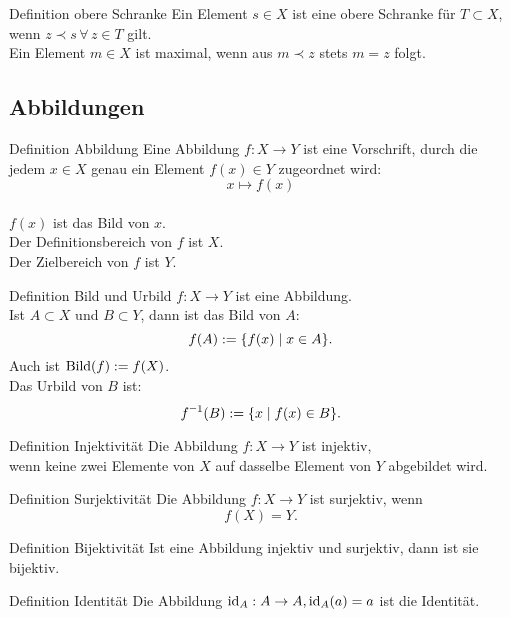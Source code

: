 \documentclass[main.tex]{subfiles}
\begin{document}
\begin{karte}{Definition obere Schranke}
    Ein Element \( s \in X \) ist eine obere Schranke für 
    \( T \subset X \), wenn \( z \prec s \,\forall \, z \in T \) 
    gilt.\\
    Ein Element \( m \in X \) ist maximal, wenn aus 
    \( m \prec z \) stets \( m = z \) folgt.
\end{karte}
\subsection*{Abbildungen}
\begin{karte}{Definition Abbildung}
    Eine Abbildung \(f : X \rightarrow Y\) ist eine Vorschrift, 
    durch die jedem \(x \in X \) genau ein Element \(f(x) \in Y\)
    zugeordnet wird:
    \[ x \mapsto f(x)\] \\
    \( f(x) \) ist das Bild von \(x\). \\
    Der Definitionsbereich von \(f\) ist \(X\). \\
    Der Zielbereich von \(f\) ist \(Y\). 
\end{karte}
\begin{karte}{Definition Bild und Urbild}
    \( f : X \rightarrow Y \) ist eine Abbildung. \\
    Ist \(A \subset X\) und \(B \subset Y\), 
    dann ist das Bild von \(A\):
    \[ f(A) := \{ f(x) \;\vert \; x \in A \}. \]
    Auch ist \( \operatorname{Bild}(f) := f(X)\). \\
    Das Urbild von \(B\) ist: 
    \[ \inverse{f}(B) := \set{x \;\vert \; f(x) \in B}. \]
\end{karte}
\begin{karte}{Definition Injektivität}
    Die Abbildung \(f: X \rightarrow Y\) ist injektiv, \\
    wenn keine zwei Elemente von \(X\) auf dasselbe 
    Element von \(Y\) abgebildet wird. 
\end{karte}
\begin{karte}{Definition Surjektivität}
    Die Abbildung \(f: X \rightarrow Y\) ist surjektiv, 
    wenn
    \[ f(X) = Y. \]
\end{karte} 
\begin{karte}{Definition Bijektivität}
    Ist eine Abbildung injektiv und surjektiv, 
    dann ist sie bijektiv. 
\end{karte}
\begin{karte}{Definition Identität}
    Die Abbildung \( \operatorname{id}_A : A \rightarrow A, 
    \operatorname{id}_A(a) = a\) ist die Identität.
\end{karte}
\end{document}
